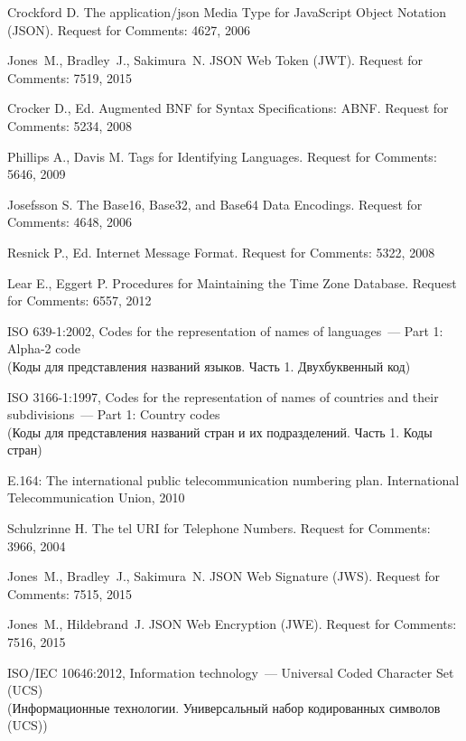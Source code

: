 \begin{thebibliography}{99}
Crockford D.
The application/json Media Type for JavaScript Object Notation (JSON).
Request for Comments: 4627, 2006

Jones~M., Bradley~J., Sakimura~N. 
JSON Web Token (JWT).
Request for Comments: 7519, 2015

Crocker D., Ed.
Augmented BNF for Syntax Specifications: ABNF.
Request for Comments: 5234, 2008

Phillips A., Davis M. 
Tags for Identifying Languages.
Request for Comments: 5646, 2009

Josefsson S. 
The Base16, Base32, and Base64 Data Encodings.
Request for Comments: 4648, 2006

Resnick P., Ed. 
Internet Message Format.
Request for Comments: 5322, 2008

Lear E., Eggert P.
Procedures for Maintaining the Time Zone Database.
Request for Comments: 6557, 2012

ISO 639-1:2002, Codes for the representation of names of languages~---
Part 1: Alpha-2 code\\
{\small (Коды для представления названий языков. Часть 1. Двухбуквенный код)}

ISO 3166-1:1997, Codes for the representation of names of
countries and their subdivisions~--- Part 1: Country codes\\
{\small (Коды для представления названий стран и их подразделений. Часть 1. 
Коды стран)}

E.164: The international public telecommunication numbering plan.
International Telecommunication Union, 2010

Schulzrinne H. 
The tel URI for Telephone Numbers.
Request for Comments: 3966, 2004

Jones~M., Bradley~J., Sakimura~N. 
JSON Web Signature (JWS).
Request for Comments: 7515, 2015

Jones~M., Hildebrand~J. 
JSON Web Encryption (JWE).
Request for Comments: 7516, 2015

ISO/IEC 10646:2012, Information technology~--- Universal Coded Character Set 
(UCS)\\
{\small (Информационные технологии. Универсальный набор кодированных 
символов (UCS))}


\end{thebibliography}
